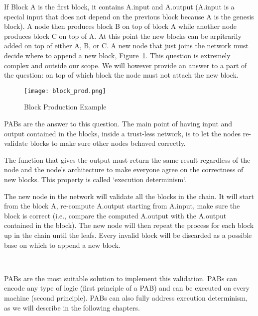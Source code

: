 \documentclass[../main.tex]{subfiles}
\begin{document}
If Block A is the first block, it contains A.input and A.output (A.input is a special input that does not depend on the previous block because A is the genesis block). A node then produces block B on top of block A while another node produces block C on top of A. At this point the new blocks can be arpitrarily added on top of either A, B, or C. A new node that just joins the network must decide where to append a new block, Figure~\ref{fig:block_prod}.  This question is extremely complex and outside our scope. We will however provide an answer to a part of the question: on top of which block the node must not attach the new block.

\begin{figure}[h]
  \centering
  \texttt{[image: block\_prod.png]}
  \caption{Block Production Example}
  \label{fig:block_prod}
\end{figure}

PABs are the answer to this question. The main point of having input and output contained in the blocks, inside a trust-less network, is to let the nodes re-validate blocks to make sure other nodes behaved correctly.

The function that gives the output must return the same result regardless of the node and the node's architecture to make everyone agree on the correctness of new blocks. This property is  called `execution determinism`.

The new node in the network will validate all the blocks in the chain. It will start from the block A,  re-compute A.output starting from A.input, make sure the block is correct (i.e., compare the computed A.output with the A.output contained in the block). The new node will then repeat the process for each block up in the chain until the leafs. Every invalid block will be discarded as a possible base on which to append a new block.

\

PABs are the most suitable solution to implement this validation. PABs can encode any type of logic (first principle of a PAB) and can be executed on every machine (second principle). PABs can also fully address execution determinism, as we will describe in the following chapters.
\end{document}
